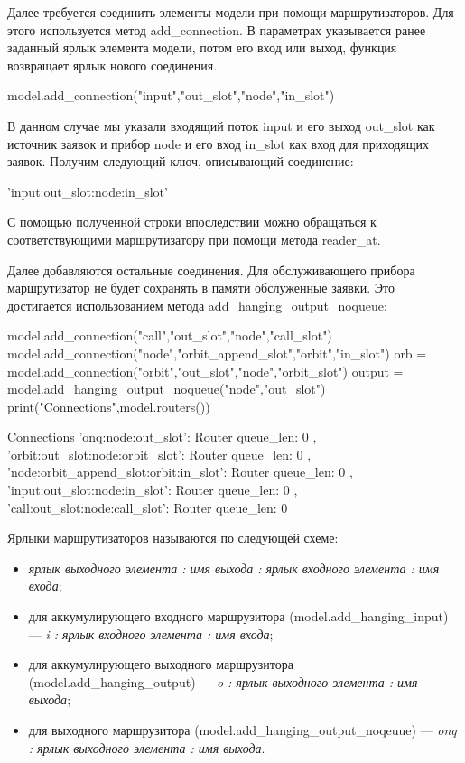 Далее требуется соединить элементы модели при помощи маршрутизаторов. Для этого используется метод add\_connection. В параметрах указывается ранее заданный ярлык элемента модели, потом его вход или выход, функция возвращает ярлык нового соединения.

\begin{pyin}
	model.add_connection("input","out_slot","node","in_slot")
\end{pyin}
В данном случае мы указали входящий поток input и его выход out\_slot как источник заявок и прибор node и его вход in\_slot как вход для приходящих заявок. Получим следующий ключ, описывающий соединение:
\begin{pyout}
'input:out_slot:node:in_slot'
\end{pyout}
С помощью полученной строки впоследствии можно обращаться к соответствующими маршрутизатору при помощи метода reader\_at.

Далее добавляются остальные соединения. Для обслуживающего прибора маршрутизатор не будет сохранять в памяти обслуженные заявки. Это достигается использованием метода add\_hanging\_output\_noqueue:
\begin{pyin}
model.add_connection("call","out_slot","node","call_slot")
model.add_connection("node","orbit_append_slot","orbit","in_slot")
orb = model.add_connection("orbit","out_slot","node","orbit_slot")
output = model.add_hanging_output_noqueue("node","out_slot")
print("Connections",model.routers())
\end{pyin}

\begin{pyout}
Connections {
'onq:node:out_slot': Router{ queue_len: 0 },
'orbit:out_slot:node:orbit_slot': Router{ queue_len: 0 },
'node:orbit_append_slot:orbit:in_slot': Router{ queue_len: 0 },
'input:out_slot:node:in_slot': Router{ queue_len: 0 },
'call:out_slot:node:call_slot': Router{ queue_len: 0 }
}
\end{pyout}

Ярлыки маршрутизаторов называются по следующей схеме:
\begin{itemize}
	\item \textit{ ярлык выходного элемента :  имя выхода :  ярлык входного элемента : имя входа};
	\item для аккумулирующего входного маршрузитора (model.add\_hanging\_input) --- \textit{i :  ярлык входного элемента : имя входа};
	\item для аккумулирующего выходного маршрузитора (model.add\_hanging\_output) --- \textit{o :  ярлык выходного элемента : имя выхода};
	\item для выходного маршрузитора (model.add\_hanging\_output\_noqeuue) --- \textit{onq :  ярлык выходного элемента : имя выхода}.
\end{itemize}

